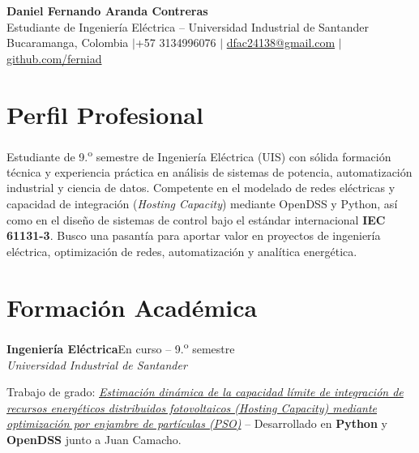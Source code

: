 \documentclass[10pt,a4paper]{article}
\newcommand{\entrada}[3]{%
    \noindent\textbf{\color{primario}#1}\hfill{\small\color{secundario}#2}\\[0pt]
    {\small\itshape\color{secundario}#3}\par\vspace{1pt}%
}
\begin{document}

\vspace{-10pt}
\begin{center}
    {\fontsize{21}{24}\selectfont\bfseries\color{primario} Daniel Fernando Aranda Contreras}\\[2pt]
    {\normalsize\color{secundario} Estudiante de Ingeniería Eléctrica -- Universidad Industrial de Santander}\\[4pt]
    {\small\color{texto}
        Bucaramanga, Colombia \quad$\vert$\quad +57 3134996076 \quad$\vert$\quad
        \href{mailto:dfac24138@gmail.com}{dfac24138@gmail.com} \quad$\vert$\quad
        \href{https://github.com/ferniad}{github.com/ferniad}
    }
\end{center}
\vspace{0pt}
\section*{Perfil Profesional}
Estudiante de 9.\textsuperscript{o} semestre de Ingeniería Eléctrica (UIS) con sólida formación técnica y experiencia práctica en análisis de sistemas de potencia, automatización industrial y ciencia de datos. Competente en el modelado de redes eléctricas y capacidad de integración (\textit{Hosting Capacity}) mediante OpenDSS y Python, así como en el diseño de sistemas de control bajo el estándar internacional \textbf{IEC 61131-3}. Busco una pasantía para aportar valor en proyectos de ingeniería eléctrica, optimización de redes, automatización y analítica energética.

\section*{Formación Académica}

\entrada{Ingeniería Eléctrica}{En curso -- 9.\textsuperscript{o} semestre}{Universidad Industrial de Santander}
{\small\color{texto} Trabajo de grado: \href{https://www.zotero.org/groups/6637268/camacho-aranda-tesis-uis}{\itshape Estimación dinámica de la capacidad límite de integración de recursos energéticos distribuidos fotovoltaicos (Hosting Capacity) mediante optimización por enjambre de partículas (PSO)} -- Desarrollado en \textbf{Python} y \textbf{OpenDSS} junto a Juan Camacho.}
\vspace{2pt}
\end{document}
